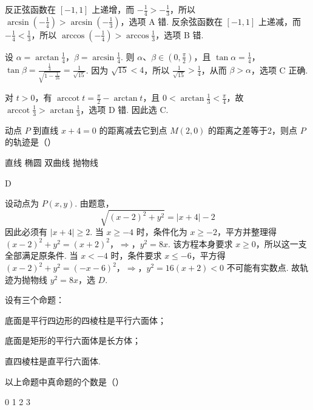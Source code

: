 \documentclass[UTF8,a4paper,oneside,11pt]{ctexbook}
\begin{document}
\begin{solution}
反正弦函数在 \([-1,1]\) 上递增，而 \(-\frac14>-\frac13\)，所以
\(\arcsin\left(-\frac14\right)>\arcsin\left(-\frac13\right)\)，选项 A 错. 反余弦函数在 \([-1,1]\) 上递减，而 \(-\frac14<\frac13\)，所以
\(\arccos\left(-\frac14\right)>\arccos\frac13\)，选项 B 错.

设 \(\alpha=\arctan\frac14\)，\(\beta=\arcsin\frac14\). 则 \(\alpha\)、\(\beta\in\left(0,\frac\pi2\right)\)，且
\(\tan\alpha=\frac14\)，\(\tan\beta=\frac{\frac{1}{4}}{\sqrt{1-\frac{1}{16}}}=\frac{1}{\sqrt{15}}\). 因为 \(\sqrt{15}<4\)，所以 \(\frac{1}{\sqrt{15}} > \frac14\)，从而 \(\beta>\alpha\)，选项 C 正确.

对 \(t>0\)，有 \(\operatorname{arccot}t=\frac\pi2-\arctan t\)，且 \(0<\arctan\frac13<\frac\pi4\)，故 \(\operatorname{arccot}\frac13>\arctan\frac13\)，选项 D 错. 因此选 C.
\end{solution}

\begin{problem}
动点 \(P\) 到直线 \(x + 4 = 0\) 的距离减去它到点 \(M(2,0)\) 的距离之差等于\(2\)，则点 \(P\) 的轨迹是（\quad）

\choices
    {直线}
    {椭圆}
    {双曲线}
    {抛物线}
\end{problem}

\begin{answer}
D
\end{answer}

\begin{solution}
设动点为 \(P(x,y)\). 由题意，
\[
\sqrt{(x-2)^2+y^2}=|x+4|-2
\]
因此必须有 \(|x+4|\geqslant 2\). 当 \(x\geqslant-4\) 时，条件化为 \(x\geqslant-2\)，平方并整理得
\((x-2)^2+y^2=(x+2)^2\)，\(\Longrightarrow\)，\(y^2=8x\).
该方程本身要求 \(x\geqslant0\)，所以这一支全部满足原条件. 当 \(x<-4\) 时，条件要求 \(x\leqslant-6\)，平方得
\((x-2)^2+y^2=(-x-6)^2\)，\(\Longrightarrow\)，\(y^2=16(x+2)<0\)
不可能有实数点. 故轨迹为抛物线 \(y^2=8x\)，选 \(D\).
\end{solution}

\begin{problem}
设有三个命题：

\begin{circlelist}
\item 底面是平行四边形的四棱柱是平行六面体；
\item 底面是矩形的平行六面体是长方体；
\item 直四棱柱是直平行六面体.
\end{circlelist}

以上命题中真命题的个数是（\quad）

\choices
    {0}
    {1}
    {2}
    {3}
\end{problem}
\end{document}
